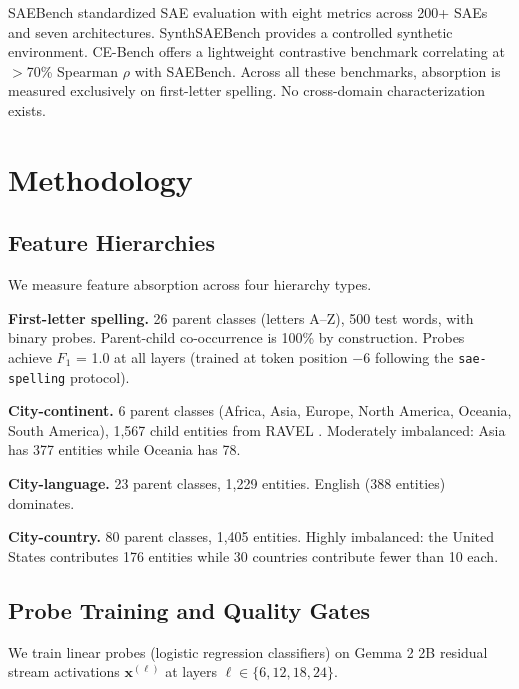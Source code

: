 \documentclass{article}
\begin{document}
SAEBench \citep{karvonen2025saebench} standardized SAE evaluation with eight metrics across 200+ SAEs and seven architectures. SynthSAEBench \citep{synthsaebench2026} provides a controlled synthetic environment. CE-Bench \citep{gulko2025cebench} offers a lightweight contrastive benchmark correlating at $>$70\% Spearman $\rho$ with SAEBench. Across all these benchmarks, absorption is measured exclusively on first-letter spelling. No cross-domain characterization exists.

\section{Methodology}
\label{sec:method}

\subsection{Feature Hierarchies}

We measure feature absorption across four hierarchy types.

\textbf{First-letter spelling.} 26 parent classes (letters A--Z), 500 test words, with binary probes. Parent-child co-occurrence is 100\% by construction. Probes achieve $F_1$ = 1.0 at all layers (trained at token position $-6$ following the \texttt{sae-spelling} protocol).

\textbf{City-continent.} 6 parent classes (Africa, Asia, Europe, North America, Oceania, South America), 1{,}567 child entities from RAVEL \citep{huang2024ravel}. Moderately imbalanced: Asia has 377 entities while Oceania has 78.

\textbf{City-language.} 23 parent classes, 1{,}229 entities. English (388 entities) dominates.

\textbf{City-country.} 80 parent classes, 1{,}405 entities. Highly imbalanced: the United States contributes 176 entities while 30 countries contribute fewer than 10 each.

\subsection{Probe Training and Quality Gates}

We train linear probes (logistic regression classifiers) on Gemma 2 2B residual stream activations $\mathbf{x}^{(\ell)}$ at layers $\ell \in \{6, 12, 18, 24\}$.
\end{document}
